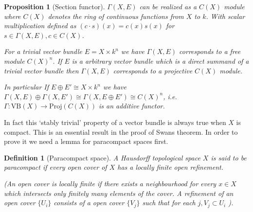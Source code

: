 \documentclass[12pt]{report}
\numberwithin{equation}{section}
\newtheorem{definition}[dummy]{Definition}
\newtheorem{proposition}[dummy]{Proposition}
\begin{document}
	\begin{proposition}[Section functor]\label{sectionfunctor}
		 $\Gamma(X,E)$ can be realized as a $C(X)$ module where $C(X)$ denotes the ring of continuous functions from $X$ to $k$. With scalar multiplication defined as $(c \cdot s)(x)=c(x) s(x)$ for $s\in \Gamma(X,E), c \in C(X)$.
		 
		 For a trivial vector bundle $E=X \times k^n$ we have $\Gamma(X,E)$ corresponds to a free module $ C(X)^n$. If $E$ is a arbitrary vector bundle which is a direct summand of a trivial vector bundle then $\Gamma(X,E) $ corresponds to a projective $C(X)$ module.
		 
		 In particular If $E \oplus E' \cong X \times k^n$ we have $\Gamma(X, E) \oplus \Gamma(X,E') \cong \Gamma(X, E \oplus E') \cong C(X)^n$, i.e. $\Gamma: \mathrm{VB}(X) \to \mathrm{Proj}(C(X))$ is an additive functor.
	\end{proposition}
	
	In fact this `stably trivial' property of a vector bundle is always true when $X$ is compact. This is an essential result in the proof of Swans theorem. In order to prove it we need a lemma for paracompact spaces first.
	\begin{definition}[Paracompact space]
		A  Hausdorff topological space $X$ is said to be paracompact if every open cover of $X$ has a locally finite open refinement.
		
		(An open cover is locally finite if there exists a neighbourhood for every $x \in X$ which intersects only finitely many elements of the cover.
		A refinement of an open cover $\{U_i\}$ consists of a open cover $\{V_j\}$ such that for each $j, V_j	\subset U_i$ ).
	\end{definition}
	
\end{document}
